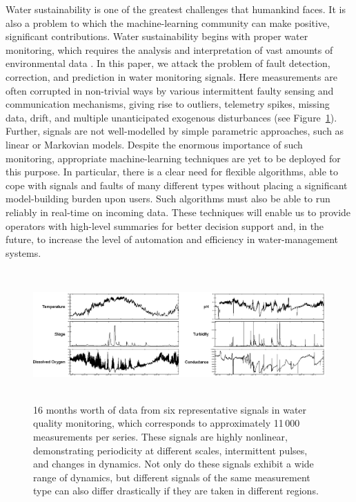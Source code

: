 \documentclass[twoside]{article}
\begin{document}
Water sustainability is one of the greatest challenges that humankind
faces. It is also a problem to which the machine-learning community
can make positive, significant contributions. Water sustainability
begins with proper water monitoring, which requires the analysis and
interpretation of vast amounts of environmental data
\citep{wagner2006guidelines}. In this paper, we attack the problem of
fault detection, correction, and prediction in water monitoring
signals.  Here measurements are often corrupted in non-trivial ways by
various intermittent faulty sensing and communication mechanisms,
giving rise to outliers, telemetry spikes, missing data, drift, and
multiple unanticipated exogenous disturbances (see
Figure~\ref{fig:monitoring}).  Further, signals are not well-modelled
by simple parametric approaches, such as linear or Markovian
models. Despite the enormous importance of such monitoring,
appropriate machine-learning techniques are yet to be deployed for
this purpose. In particular, there is a clear need for flexible
algorithms, able to cope with signals and faults of many different
types without placing a significant model-building burden upon
users. Such algorithms must also be able to run reliably in real-time
on incoming data.
These techniques will enable us to provide operators with high-level
summaries for better decision support and, in the future, to increase
the level of automation and efficiency in water-management systems.

\begin{figure}[t!]
\begin{center}
 \includegraphics[width=\textwidth, height=5cm]{watermonitoring.eps}
\end{center}
\caption{16 months worth of data from six representative
signals in water quality monitoring,
which corresponds to approximately 11\,000 measurements per series.
These signals are highly nonlinear, demonstrating periodicity at
different scales,
intermittent pulses, and changes in dynamics. Not only do these
signals exhibit a wide range of dynamics,
but different signals of the same measurement type can also differ
drastically if they are taken in different regions.
}
\label{fig:monitoring}
\end{figure}
\end{document}

